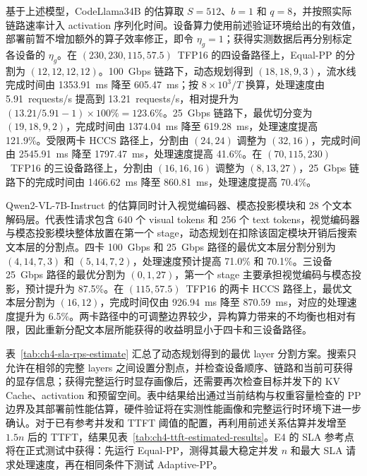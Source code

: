 基于上述模型，CodeLlama34B 的估算取 \(S=512\)、\(b=1\) 和 \(q=8\)，并按照实际链路速率计入 activation 序列化时间。设备算力使用前述验证环境给出的有效值，部署前暂不增加额外的算子效率修正，即令 \(\eta_g=1\)；获得实测数据后再分别标定各设备的 \(\eta_g\)。在 \((230,230,115,57.5)\)~TFP16 的四设备路径上，Equal-PP 的分割为 \((12,12,12,12)\)。100~Gbps 链路下，动态规划得到 \((18,18,9,3)\)，流水线完成时间由 1353.91~ms 降至 605.47~ms；按 \(8\times10^3/T\) 换算，处理速度由 5.91~requests/s 提高到 13.21~requests/s，相对提升为 \((13.21/5.91-1)\times100\%=123.6\%\)。25~Gbps 链路下，最优切分变为 \((19,18,9,2)\)，完成时间由 1374.04~ms 降至 619.28~ms，处理速度提高 121.9\%。受限两卡 HCCS 路径上，分割由 \((24,24)\) 调整为 \((32,16)\)，完成时间由 2545.91~ms 降至 1797.47~ms，处理速度提高 41.6\%。在 \((70,115,230)\)~TFP16 的三设备路径上，分割由 \((16,16,16)\) 调整为 \((8,13,27)\)，25~Gbps 链路下的完成时间由 1466.62~ms 降至 860.81~ms，处理速度提高 70.4\%。

Qwen2-VL-7B-Instruct 的估算同时计入视觉编码器、模态投影模块和 28 个文本解码层。代表性请求包含 640 个 visual tokens 和 256 个 text tokens，视觉编码器与模态投影模块整体放置在第一个 stage，动态规划在扣除该固定模块开销后搜索文本层的分割点。四卡 100~Gbps 和 25~Gbps 路径的最优文本层分割分别为 \((4,14,7,3)\) 和 \((5,14,7,2)\)，处理速度预计提高 71.0\% 和 70.1\%。三设备 25~Gbps 路径的最优分割为 \((0,1,27)\)，第一个 stage 主要承担视觉编码与模态投影，预计提升为 87.5\%。在 \((115,57.5)\)~TFP16 的两卡 HCCS 路径上，最优文本层分割为 \((16,12)\)，完成时间仅由 926.94~ms 降至 870.59~ms，对应的处理速度提升为 6.5\%。两卡路径中的可调整边界较少，异构算力带来的不均衡也相对有限，因此重新分配文本层所能获得的收益明显小于四卡和三设备路径。

表~\ref{tab:ch4-sla-rps-estimate} 汇总了动态规划得到的最优 layer 分割方案。搜索只允许在相邻的完整 layers 之间设置分割点，并检查设备顺序、链路和当前可获得的显存信息；获得完整运行时显存画像后，还需要再次检查目标并发下的 KV Cache、activation 和预留空间。表中结果给出通过当前结构与权重容量检查的 PP 边界及其部署前性能估算，硬件验证将在实测性能画像和完整运行时环境下进一步确认。对于已有参考并发和 TTFT 阈值的配置，再利用前述关系估算并发增至 \(1.5n\) 后的 TTFT，结果见表~\ref{tab:ch4-ttft-estimated-results}。E4 的 SLA 参考点将在正式测试中获得：先运行 Equal-PP，测得其最大稳定并发 \(n\) 和最大 SLA 请求处理速度，再在相同条件下测试 Adaptive-PP。

